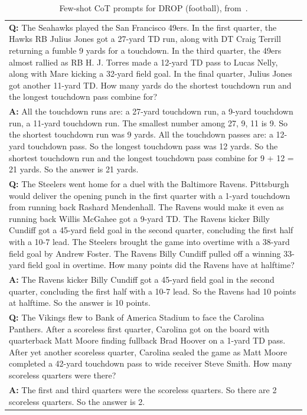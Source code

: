 \begin{table}[h]
    \caption{
    Few-shot CoT prompts for DROP (football), from~\cite{Zhou2022LeasttoMostPE}.
    }
    \centering
    \small
    \begin{tabular}{p{13.5cm}}
        \toprule
        \textbf{Q:} The Seahawks played the San Francisco 49ers. In the first quarter, the Hawks RB Julius Jones got a 27-yard TD run, along with DT Craig Terrill returning a fumble 9 yards for a touchdown. In the third quarter, the 49ers almost rallied as RB H. J. Torres made a 12-yard TD pass to Lucas Nelly, along with Mare kicking a 32-yard field goal. In the final quarter, Julius Jones got another 11-yard TD. How many yards do the shortest touchdown run and the longest touchdown pass combine for? \\
        \vspace{-1mm}
        \textbf{A:} All the touchdown runs are: a 27-yard touchdown run, a 9-yard touchdown run, a 11-yard touchdown run. The smallest number among 27, 9, 11 is 9. So the shortest touchdown run was 9 yards. All the touchdown passes are: a 12-yard touchdown pass. So the longest touchdown pass was 12 yards. So the shortest touchdown run and the longest touchdown pass combine for 9 + 12 = 21 yards. So the answer is 21 yards. \\
        \vspace{0mm}
        \textbf{Q:} The Steelers went home for a duel with the Baltimore Ravens. Pittsburgh would deliver the opening punch in the first quarter with a 1-yard touchdown from running back Rashard Mendenhall. The Ravens would make it even as running back Willis McGahee got a 9-yard TD. The Ravens kicker Billy Cundiff got a 45-yard field goal in the second quarter, concluding the first half with a 10-7 lead. The Steelers brought the game into overtime with a 38-yard field goal by Andrew Foster. The Ravens Billy Cundiff pulled off a winning 33-yard field goal in overtime. How many points did the Ravens have at halftime? \\
        \vspace{-1mm}
        \textbf{A:} The Ravens kicker Billy Cundiff got a 45-yard field goal in the second quarter, concluding the first half with a 10-7 lead.  So the Ravens had 10 points at halftime. So the answer is 10 points. \\
        \vspace{0mm}
        \textbf{Q:} The Vikings flew to Bank of America Stadium to face the Carolina Panthers. After a scoreless first quarter, Carolina got on the board with quarterback Matt Moore finding fullback Brad Hoover on a 1-yard TD pass. After yet another scoreless quarter, Carolina sealed the game as Matt Moore completed a 42-yard touchdown pass to wide receiver Steve Smith. How many scoreless quarters were there? \\
        \vspace{-1mm}
        \textbf{A:} The first and third quarters were the scoreless quarters. So there are 2 scoreless quarters. So the answer is 2. \\
        \bottomrule
    \end{tabular}
    \label{tab:prompt-dropf}
\end{table}



